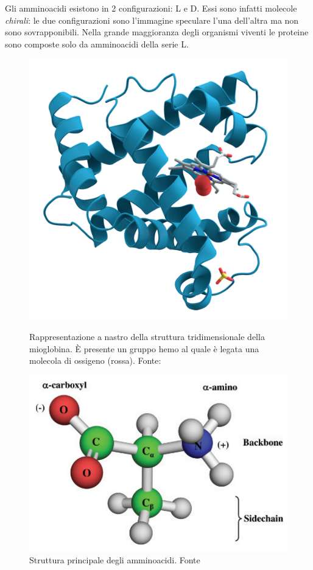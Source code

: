 \par Gli amminoacidi esistono in 2 configurazioni: L e D. Essi sono infatti molecole \textit{chirali}: le due configurazioni sono l'immagine speculare l'una dell'altra ma non sono sovrapponibili. Nella grande maggioranza degli organismi viventi le proteine sono composte solo da amminoacidi della serie L.

\begin{figure}[!htb]
	\centering
	\includegraphics[scale=0.15]{images/mioglobina.png}
	\caption{Rappresentazione a nastro della struttura tridimensionale della mioglobina. È presente un gruppo hemo al quale è legata una molecola di ossigeno (rossa). Fonte: \cite{proteinWiki}}
	\label{fig:mioglobina}
	\endminipage\hfill
	\centering
	\includegraphics[scale=0.3]{images/amminoacido.png}
	\caption{Struttura principale degli amminoacidi. Fonte \cite{kessel_ben-tal_2018}}
	\label{fig:amminoacido}
	\endminipage\hfill
\end{figure}

